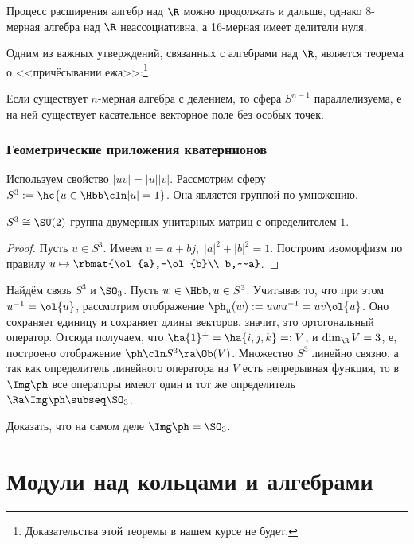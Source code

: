 \documentclass[a4paper]{article}
\begin{document}
\begin{note}
Процесс расширения алгебр над $\R$ можно продолжать и дальше, однако 8-мерная алгебра над $\R$
неассоциативна,  а 16-мерная имеет делители нуля.
\end{note}

Одним из важных утверждений, связанных с алгебрами над $\R$, является теорема о <<причёсывании
ежа>>:\footnote{Доказательства этой теоремы в нашем курсе не будет.}
\begin{theorem}
Если существует $n$-мерная алгебра с делением, то сфера $S^{n-1}$ параллелизуема, е на ней существует касательное
векторное поле без особых точек.
\end{theorem}

\subsubsection{Геометрические приложения кватернионов}

Используем свойство $|uv|=|u||v|$. Рассмотрим сферу $S^3 :=\hc{u \in \Hbb\cln |u|=1}$. Она является группой по
умножению.
\begin{stm}
$S^3 \cong \SU(2)$ группа двумерных унитарных матриц с определителем $1$.
\end{stm}
\begin{proof}
Пусть $u \in S^3$. Имеем $u=a+bj, \; |a|^2+|b|^2=1$. Построим изоморфизм по  правилу $u \mapsto
\rbmat{\ol{a},-\ol{b}\\ b,~~a}$.
\end{proof}

Найдём связь $S^3$ и $\SO_3$. Пусть $w \in \Hbb, u \in S^3$. Учитывая то, что при этом $u^{-1}=\ol{u}$,
рассмотрим отображение $\ph_u(w):=uwu^{-1}=uv\ol{u}$. Оно сохраняет единицу и сохраняет длины векторов,
значит, это ортогональный оператор. Отсюда получаем, что $\ha{1}^\bot=\ha{i,j,k}=:V$, и $\dim_\R V =3$, е,
построено отображение $\ph\cln S^3 \ra \Ob(V)$. Множество $S^3$ линейно связно, а так как
определитель линейного оператора на $V$ есть непрерывная функция, то в $\Img \ph$ все операторы имеют один и
тот же определитель $\Ra \Img \ph \subseq \SO_3$.

\begin{problem}
Доказать, что на самом деле $\Img \ph = \SO_3$.
\end{problem}

\section{Модули над кольцами и алгебрами}
\end{document}
